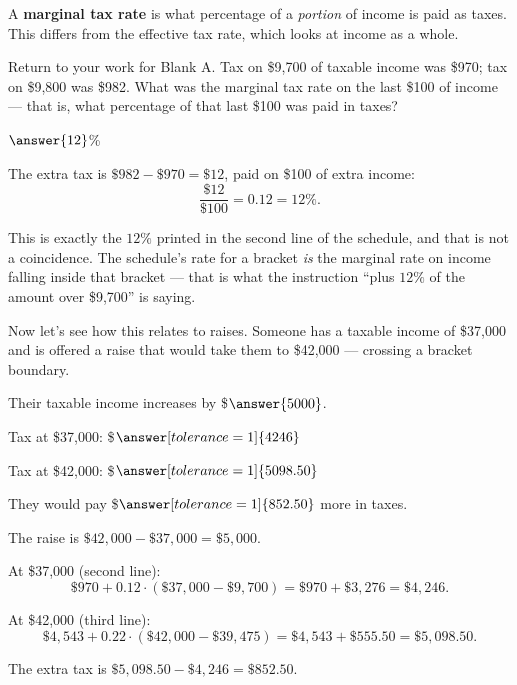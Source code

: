 \documentclass[12pt]{ximera}
\begin{document}
A \textbf{marginal tax rate} is what percentage of a \emph{portion} of income is paid as
taxes. This differs from the effective tax rate, which looks at income as a whole.

\begin{problem}
Return to your work for Blank A. Tax on \$9,700 of taxable income was \$970; tax on
\$9,800 was \$982. What was the marginal tax rate on the last \$100 of income --- that
is, what percentage of that last \$100 was paid in taxes?

$\answer{12}$\%

\begin{freeResponse}
\end{freeResponse}

\begin{solution}
The extra tax is $\$982 - \$970 = \$12$, paid on \$100 of extra income:
\[
\frac{\$12}{\$100} = 0.12 = 12\%.
\]

This is exactly the $12\%$ printed in the second line of the schedule, and that is not a
coincidence. The schedule's rate for a bracket \emph{is} the marginal rate on income
falling inside that bracket --- that is what the instruction ``plus $12\%$ of the amount
over \$9,700'' is saying.
\end{solution}
\end{problem}

\begin{problem}
Now let's see how this relates to raises. Someone has a taxable income of \$37,000 and
is offered a raise that would take them to \$42,000 --- crossing a bracket boundary.

Their taxable income increases by \$$\answer{5000}$.

Tax at \$37,000: \$$\answer[tolerance=1]{4246}$

Tax at \$42,000: \$$\answer[tolerance=1]{5098.50}$

They would pay \$$\answer[tolerance=1]{852.50}$ more in taxes.

\begin{solution}
The raise is $\$42{,}000 - \$37{,}000 = \$5{,}000$.

At \$37,000 (second line):
\[
\$970 + 0.12 \cdot (\$37{,}000 - \$9{,}700) = \$970 + \$3{,}276 = \$4{,}246.
\]

At \$42,000 (third line):
\[
\$4{,}543 + 0.22 \cdot (\$42{,}000 - \$39{,}475) = \$4{,}543 + \$555.50 = \$5{,}098.50.
\]

The extra tax is $\$5{,}098.50 - \$4{,}246 = \$852.50$.
\end{solution}
\end{problem}
\end{document}
